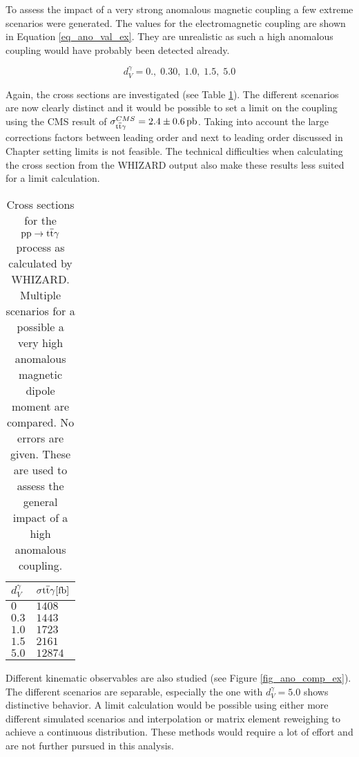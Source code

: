 To assess the impact of a very strong anomalous magnetic coupling a few extreme scenarios were generated. The values for the electromagnetic coupling are shown in Equation \ref{eq_ano_val_ex}. They are unrealistic as such a high anomalous coupling would have probably been detected already.

\begin{equation}
d_V^{\gamma} = 0.,\; 0.30,\; 1.0,\;1.5,\; 5.0
\label{eq_ano_val_ex}
\end{equation}

Again, the cross sections are investigated (see Table \ref{tab_ano_crosssec_ex}). The different scenarios are now clearly distinct and it would be possible to set a limit on the coupling using the CMS result of $\sigma^{CMS}_{\ttgamma} = \SI{2.4 \pm 0.6}{\pico \barn}$\cite{CMS-PAS-TOP-13-011}. Taking into account the large corrections factors between leading order and next to leading order discussed in Chapter  setting limits is not feasible. The technical difficulties when calculating the cross section from the WHIZARD output also make these results less suited for a limit calculation. \\

\begin{table}[ht]
\centering
    \caption{Cross sections for the $\mathrm{pp} \to \mathrm{t}\overline{\mathrm{t}} \gamma$ process as calculated by WHIZARD. Multiple scenarios for a possible a very high anomalous magnetic dipole moment are compared. No errors are given. These are used to assess the general impact of a high anomalous coupling.}
    \begin{tabular}{| l | l |}

    \hline
    $d_{V}^{\gamma}$ & $\sigma{\ttgamma} [\SI{}{\femto \barn}]$ \\
    \hline
    $0$ &  $1408$\\
    \hline
    $0.3$ & $1443 $ \\
    \hline
    $1.0$ & $1723 $ \\
    \hline
    $1.5$ & $2161 $ \\
    \hline
    $5.0$ &  $12874 $\\
    \hline
    \end{tabular}
     \label{tab_ano_crosssec_ex}
\end{table}

Different kinematic observables are also studied (see Figure \ref{fig_ano_comp_ex}). The different scenarios are separable, especially the one with $d_{V}^{\gamma} = 5.0$ shows distinctive behavior. A limit calculation would be possible using either more different simulated scenarios and interpolation or  matrix element reweighing to achieve a continuous distribution. These methods would require a lot of effort and are not further pursued in this analysis.

